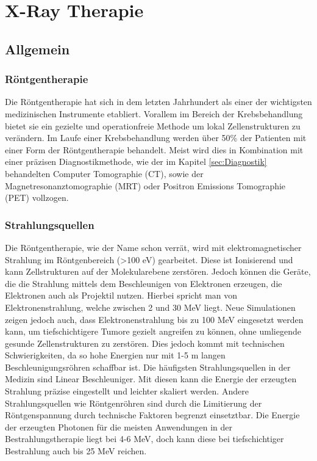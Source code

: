 \section{X-Ray Therapie}

\subsection{Allgemein}


\subsubsection{Röntgentherapie}
Die Röntgentherapie hat sich in dem letzten Jahrhundert als einer der wichtigsten medizinischen Instrumente etabliert.
Vorallem im Bereich der Krebsbehandlung bietet sie ein gezielte und operationfreie Methode um lokal Zellenstrukturen zu verändern.
Im Laufe einer Krebsbehandlung werden über 50\% der Patienten mit einer Form der Röntgentherapie behandelt.
Meist wird dies in Kombination mit einer präzisen Diagnostikmethode, wie der im Kapitel \ref{sec:Diagnostik} behandelten Computer Tomographie (CT), sowie
der Magnetresonanztomographie (MRT) oder Positron Emissions Tomographie (PET) vollzogen. \cite{hoskin2019external}
\subsubsection{Strahlungsquellen}
Die Röntgentherapie, wie der Name schon verrät, wird mit elektromagnetischer Strahlung im Röntgenbereich (>100 eV) gearbeitet. 
Diese ist Ionisierend und kann Zellstrukturen auf der Molekularebene zerstören.
Jedoch können die Geräte, die die Strahlung mittels dem Beschleunigen von Elektronen erzeugen, die Elektronen auch als Projektil nutzen.
Hierbei spricht man von Elektronenstrahlung, welche zwischen 2 und 30 MeV liegt.
Neue Simulationen zeigen jedoch auch, dass Elektronenstrahlung bis zu 100 MeV eingesetzt werden kann, um tiefschichtigere Tumore gezielt angreifen zu können, ohne umliegende gesunde Zellenstrukturen zu zerstören.
Dies jedoch kommt mit technischen Schwierigkeiten, da so hohe Energien nur mit 1-5 m langen Beschleunigungsröhren schaffbar ist. \cite{shady_author}
Die häufigsten Strahlungsquellen in der Medizin sind Linear Beschleuniger.
Mit diesen kann die Energie der erzeugten Strahlung präzise eingestellt und leichter skaliert werden.
Andere Strahlungsquellen wie Röntgenröhren sind durch die Limitierung der Röntgenspannung durch technische Faktoren begrenzt einsetztbar.
Die Energie der erzeugten Photonen für die meisten Anwendungen in der Bestrahlungstherapie liegt bei 4-6 MeV, doch kann diese bei tiefschichtiger Bestrahlung auch bis 25 MeV reichen. \cite{KriegerHannoSfTu}









